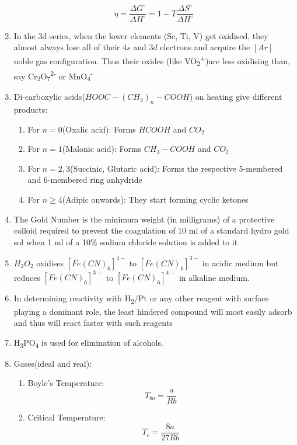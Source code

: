 \documentclass{article}
\numberwithin{equation}{section}
\numberwithin{figure}{section}
\newcommand{\Sub}[1]{\textsubscript{#1}}
\newcommand{\Sup}[1]{\textsuperscript{#1}}
\begin{document}
\begin{enumerate}
		\begin{equation}
			\eta=\frac{\Delta G^{\circ}}{\Delta H^{\circ}}=1-T\frac{\Delta S^{\circ}}{\Delta H^{\circ}}
		\end{equation}
	\item In the 3d series, when the lower elements (Sc, Ti, V) get oxidised, they almost always lose all of their $4s$ and $3d$ electrons and acquire the $[Ar]$ noble gas configuration. Thus their oxides (like VO\Sub{2}\Sup{+})are less oxidising than, say Cr\Sub{2}O\Sub{7}\Sup{2-} or MnO\Sub{4}\Sup{-}
	\item Di-carboxylic acids($HOOC-(CH_2)_{n}-COOH$) on heating give different products:
		\begin{enumerate}
			\item For $n=0$(Oxalic acid): Forms $HCOOH$ and $CO_2$
			\item For $n=1$(Malonic acid): Forms $CH_3-COOH$ and $CO_2$
			\item For $n=2,3$(Succinic, Glutaric acid): Forms the respective 5-membered and 6-membered ring anhydride
			\item For $n\geq 4$(Adipic onwards): They start forming cyclic ketones
		\end{enumerate}
	\item The Gold Number is the minimum weight (in milligrams) of a protective colloid required to prevent the coagulation of 10 ml of a standard hydro gold sol when 1 ml of a 10\% sodium chloride solution is added to it
	\item $H_2 O_2$ oxidises $[Fe (CN)_6]^{4-}$ to $[Fe(CN)_6]^{3-}$ in acidic medium but reduces $[Fe(CN)_6]^{3-}$ to $[Fe(CN)_6]^{4-}$ in alkaline medium.
	\item In determining reactivity with H\Sub{2}/Pt or any other reagent with surface playing a dominant role, the least hindered compound will most easily adsorb and thus will react faster with such reagents
	\item H\Sub{3}PO\Sub{4} is used for elimination of alcohols.
	\item Gases(ideal and real):
		\begin{enumerate}
			\item Boyle's Temperature:
				\begin{equation}
					T_{bo}=\frac{a}{Rb}
				\end{equation}
			\item Critical Temperature:
				\begin{equation}
					T_{c}=\frac{8a}{27 Rb}
				\end{equation}

\end{enumerate}
\end{enumerate}
\end{document}
